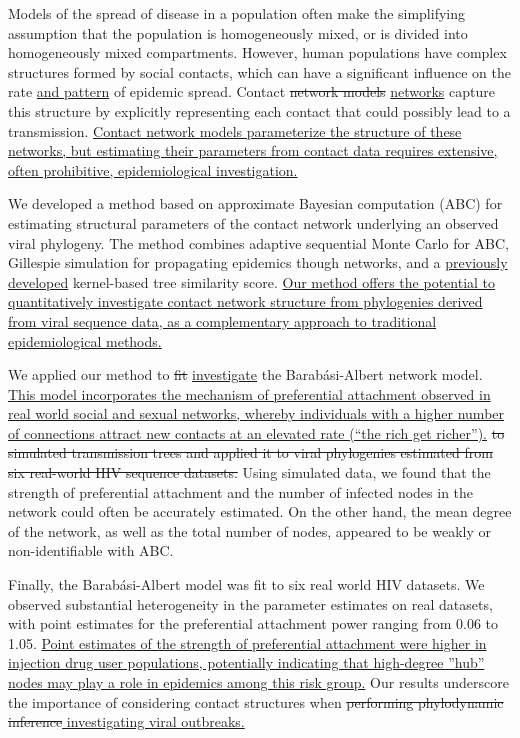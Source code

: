 Models of the spread of disease in a population often make the simplifying
assumption that the population is homogeneously mixed, or is divided into
homogeneously mixed compartments. However, human populations have complex
structures formed by social contacts, which can have a significant influence on
the rate {\color{blue}\uline{and pattern}} of epidemic spread. Contact
{\color{red}\sout{network models}} {\color{blue}\uline{networks}} capture this
structure by explicitly representing each contact that could possibly lead to a
transmission. {\color{blue}\uline{Contact network models parameterize the
structure of these networks, but estimating their parameters from contact data
requires extensive, often prohibitive, epidemiological investigation. }}

We developed a method based on approximate Bayesian computation (ABC) for
estimating structural parameters of the contact network underlying an
observed viral phylogeny. The method combines adaptive sequential Monte Carlo
for ABC, Gillespie simulation for propagating epidemics though networks, and a
{\color{blue}\uline{previously developed}} kernel-based tree similarity score.
{\color{blue}\uline{Our method offers the potential to quantitatively
investigate contact network structure from phylogenies derived from viral
sequence data, as a complementary approach to traditional epidemiological
methods.}}

We applied our method to {\color{red}\sout{fit}}
{\color{blue}\uline{investigate}} the Barab\'{a}si-Albert network model.
{\color{blue}\uline{This model incorporates the mechanism of preferential
attachment observed in real world social and sexual networks, whereby
individuals with a higher number of connections attract new contacts at an
elevated rate (``the rich get richer'').}}
{\color{red}\sout{to simulated transmission trees and applied it to viral
phylogenies estimated from six real-world HIV sequence datasets.}} Using
simulated data, we found that the strength of preferential attachment and the
number of infected nodes in the network could often be accurately estimated. On
the other hand, the mean degree of the network, as well as the total number of
nodes, appeared to be weakly or non-identifiable with ABC. 

Finally, the Barab\'{a}si-Albert model was fit to six real world HIV datasets.
We observed substantial heterogeneity in the parameter estimates on real
datasets, with point estimates for the preferential attachment power ranging
from 0.06 to 1.05. 
{\color{blue}\uline{Point estimates of the strength of preferential attachment 
were higher in injection drug user populations, potentially indicating that
high-degree ''hub'' nodes may play a role in epidemics among this risk group.}}
Our results underscore the importance of considering contact structures when
{\color{red}\sout{performing phylodynamic inference}}{\color{blue}\uline{
investigating viral outbreaks.}}
